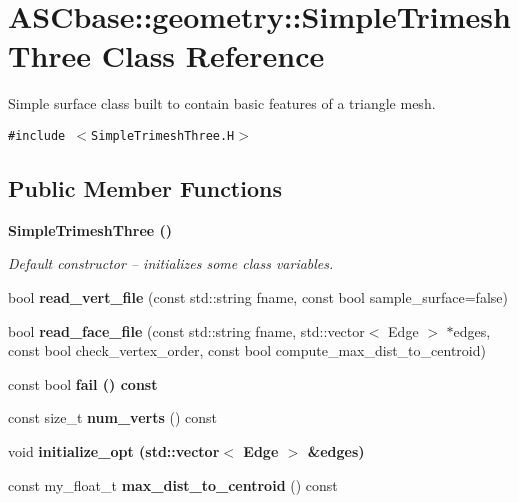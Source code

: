 \section{ASCbase::geometry::Simple\-Trimesh\-Three Class Reference}
\label{classASCbase_1_1geometry_1_1SimpleTrimeshThree}
Simple surface class built to contain basic features of a triangle mesh.  


{\tt \#include $<$Simple\-Trimesh\-Three.H$>$}

\subsection*{Public Member Functions}
\begin{CompactItemize}
\item 
\bf{Simple\-Trimesh\-Three} ()\label{classASCbase_1_1geometry_1_1SimpleTrimeshThree_188f1d854a84a1bc43b93ba69732ead9}

\begin{CompactList}\small\item\em Default constructor -- initializes some class variables. \item\end{CompactList}\item 
bool \textbf{read\_\-vert\_\-file} (const std::string fname, const bool sample\_\-surface=false)\label{classASCbase_1_1geometry_1_1SimpleTrimeshThree_c9550b4265e3c6cdcaf8cb7ef4240421}

\item 
bool \textbf{read\_\-face\_\-file} (const std::string fname, std::vector$<$ Edge $>$ $\ast$edges, const bool check\_\-vertex\_\-order, const bool compute\_\-max\_\-dist\_\-to\_\-centroid)\label{classASCbase_1_1geometry_1_1SimpleTrimeshThree_a2eef2ac284240c555bc43308012e375}

\item 
const bool \bf{fail} () const 
\item 
const size\_\-t \textbf{num\_\-verts} () const \label{classASCbase_1_1geometry_1_1SimpleTrimeshThree_7357eadf46a005993e7bb4cb1525b3e7}

\item 
void \bf{initialize\_\-opt} (std::vector$<$ Edge $>$ \&edges)
\item 
const my\_\-float\_\-t \textbf{max\_\-dist\_\-to\_\-centroid} () const \label{classASCbase_1_1geometry_1_1SimpleTrimeshThree_623a310518c90b27345b436082e5d5dc}


\end{CompactItemize}
